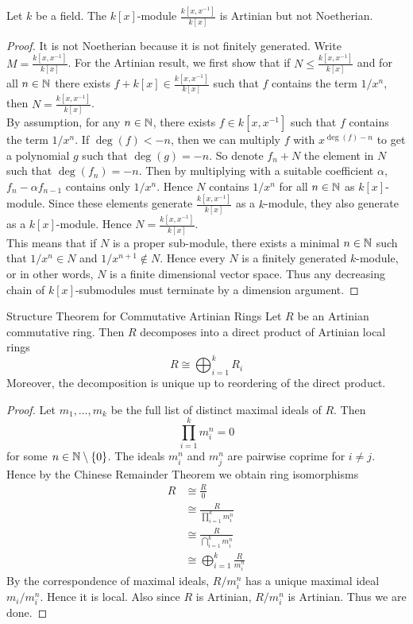 \documentclass[a4paper]{article}
\begin{document}
\begin{eg}{}{} Let $k$ be a field. The $k[x]$-module $\frac{k[x,x^{-1}]}{k[x]}$ is Artinian but not Noetherian. 
\begin{proof}
It is not Noetherian because it is not finitely generated. Write $M=\frac{k[x,x^{-1}]}{k[x]}$. For the Artinian result, we first show that if $N\leq\frac{k[x,x^{-1}]}{k[x]}$ and for all $n\in\mathbb{N}$ there exists $f+k[x]\in\frac{k[x,x^{-1}]}{k[x]}$ such that $f$ contains the term $1/x^n$, then $N=\frac{k[x,x^{-1}]}{k[x]}$. \\

By assumption, for any $n\in\mathbb{N}$, there exists $f\in k[x,x^{-1}]$ such that $f$ contains the term $1/x^n$. If $\deg(f)<-n$, then we can multiply $f$ with $x^{\deg(f)-n}$ to get a polynomial $g$ such that $\deg(g)=-n$. So denote $f_n+N$ the element in $N$ such that $\deg(f_n)=-n$. Then by multiplying with a suitable coefficient $\alpha$, $f_n-\alpha f_{n-1}$ contains only $1/x^n$. Hence $N$ contains $1/x^n$ for all $n\in\mathbb{N}$ as $k[x]$-module. Since these elements generate $\frac{k[x,x^{-1}]}{k[x]}$ as a $k$-module, they also generate as a $k[x]$-module. Hence $N=\frac{k[x,x^{-1}]}{k[x]}$. \\

This means that if $N$ is a proper sub-module, there exists a minimal $n\in\mathbb{N}$ such that $1/x^n\in N$ and $1/x^{n+1}\notin N$. Hence every $N$ is a finitely generated $k$-module, or in other words, $N$ is a finite dimensional vector space. Thus any decreasing chain of $k[x]$-submodules must terminate by a dimension argument. 
\end{proof}
\end{eg}

\begin{thm}{Structure Theorem for Commutative Artinian Rings}{} Let $R$ be an Artinian commutative ring. Then $R$ decomposes into a direct product of Artinian local rings $$R\cong\bigoplus_{i=1}^k R_i$$ Moreover, the decomposition is unique up to reordering of the direct product.  
\begin{proof}
Let $m_1,\dots,m_k$ be the full list of distinct maximal ideals of $R$. Then $$\prod_{i=1}^km_i^n=0$$ for some $n\in\mathbb{N}\setminus\{0\}$. The ideals $m_i^n$ and $m_j^n$ are pairwise coprime for $i\neq j$. Hence by the Chinese Remainder Theorem we obtain ring isomorphisms 
\begin{align*}
R&\cong\frac{R}{0}\\
&\cong\frac{R}{\prod_{i=1}^km_i^n}\\
&\cong\frac{R}{\bigcap_{i=1}^km_i^n}\tag{$m_i^n$ and $m_j^n$ pairwise coprime}\\
&\cong\bigoplus_{i=1}^k\frac{R}{m_i^n}\tag{CRT}
\end{align*}
By the correspondence of maximal ideals, $R/m_i^n$ has a unique maximal ideal $m_i/m_i^n$. Hence it is local. Also since $R$ is Artinian, $R/m_i^n$ is Artinian. Thus we are done. 
\end{proof}
\end{thm}
\end{document}
